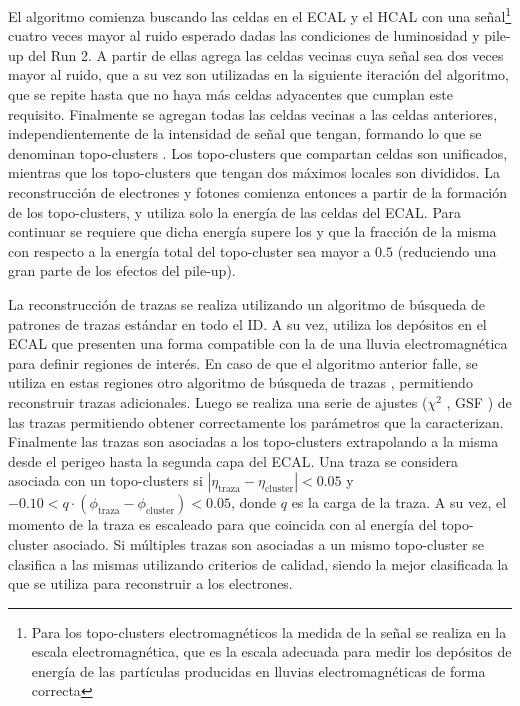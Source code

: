 El algoritmo comienza buscando las celdas en el ECAL y el HCAL con una señal\footnote{Para los topo-clusters electromagnéticos la medida de la señal se realiza en la escala electromagnética, que es la escala adecuada para medir los depósitos de energía de las partículas producidas en lluvias electromagnéticas de forma correcta} 
cuatro veces mayor al ruido esperado dadas las condiciones de luminosidad y pile-up del Run 2. A partir de ellas agrega las celdas vecinas cuya señal sea dos veces mayor al ruido,
que a su vez son utilizadas en la siguiente iteración del algoritmo, que se repite hasta que no haya más celdas adyacentes que cumplan este requisito. Finalmente se agregan todas las celdas vecinas a las celdas anteriores, independientemente de la intensidad de señal que tengan, formando lo que se denominan topo-clusters \cite{PERF-2014-07, Lampl:1099735}. Los topo-clusters que compartan celdas son unificados, mientras que los topo-clusters que tengan dos máximos locales son divididos. La reconstrucción de electrones y fotones comienza entonces a partir de la formación de los topo-clusters, y utiliza solo la energía de las celdas del ECAL. Para continuar se requiere que dicha energía supere los  y que la fracción de la misma con respecto a la energía total del topo-cluster sea mayor a $0.5$ (reduciendo una gran parte de los efectos del pile-up).  




La reconstrucción de trazas se realiza utilizando un algoritmo de búsqueda de patrones de trazas estándar
\cite{Cornelissen:1020106, PERF-2017-02, PERF-2017-01} en todo el ID. A su vez, utiliza los depósitos en el ECAL que presenten una forma compatible con la de una lluvia electromagnética para definir regiones de interés. En caso de que el algoritmo anterior falle, se utiliza en estas regiones otro algoritmo de búsqueda de trazas \cite{FRUHWIRTH1987444}, permitiendo reconstruir trazas adicionales. Luego se realiza una serie de ajustes ($\chi^2$ \cite{Cornelissen:1176901}, GSF \cite{ATLAS-CONF-2012-047}) de las trazas permitiendo obtener correctamente los parámetros que la caracterizan. Finalmente las trazas son asociadas a los topo-clusters extrapolando a la misma desde el perigeo hasta la segunda capa del ECAL. Una traza se considera asociada con un topo-clusters si $|\eta_{\text{traza}}-\eta_{\text{cluster}}|<0.05$ y $-0.10<q\cdot(\phi_{\text{traza}}-\phi_{\text{cluster}})<0.05$, donde $q$ es la carga de la traza. A su vez, el momento de la traza es escaleado para que coincida con al energía del topo-cluster asociado. Si múltiples trazas son asociadas a un mismo topo-cluster se clasifica a las mismas utilizando criterios de calidad, siendo la mejor clasificada la que se utiliza para reconstruir a los electrones. 

